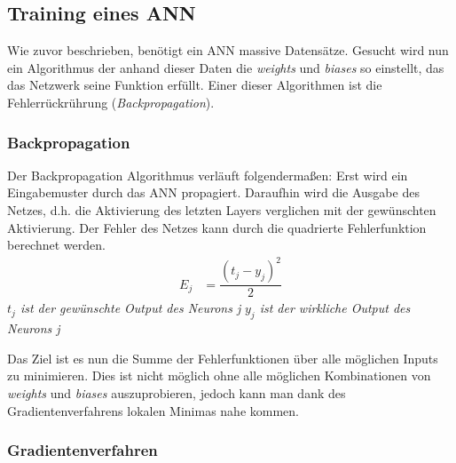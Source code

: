 \documentclass{thesisclass}
\begin{document}
\subsection{Training eines \gls{ANN}}
Wie zuvor beschrieben, benötigt ein \gls{ANN} massive Datensätze. Gesucht wird nun ein Algorithmus der anhand dieser Daten die \textit{weights} und \textit{biases} so einstellt, das das Netzwerk seine Funktion erfüllt. 
Einer dieser Algorithmen ist die Fehlerrückrührung (\textit{Backpropagation}).

\subsubsection{Backpropagation}
Der Backpropagation Algorithmus verläuft folgendermaßen: Erst wird ein Eingabemuster durch das \gls{ANN} propagiert. Daraufhin wird die Ausgabe des Netzes, d.h. die Aktivierung des letzten Layers verglichen mit der gewünschten Aktivierung. Der Fehler des Netzes kann durch die quadrierte Fehlerfunktion berechnet werden.
\begin{align*}
E_j &= \dfrac{(t_j - y_j)^2}{2}
\end{align*}
\textit{$t_j$ ist der gewünschte Output des Neurons j} \newline
\textit{$y_j$ ist der wirkliche Output des Neurons j}		\newline


Das Ziel ist es nun die Summe der Fehlerfunktionen über alle möglichen Inputs zu minimieren. Dies ist nicht möglich ohne alle möglichen Kombinationen von \textit{weights} und \textit{biases} auszuprobieren, jedoch kann man dank des Gradientenverfahrens lokalen Minimas nahe kommen.

\subsubsection{Gradientenverfahren}
\end{document}
